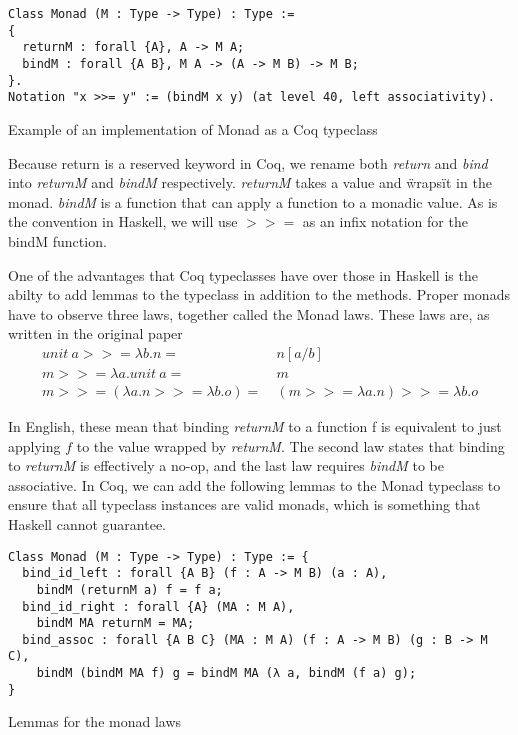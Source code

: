 \begin{listing}[H]
\begin{verbatim}
Class Monad (M : Type -> Type) : Type :=
{
  returnM : forall {A}, A -> M A;
  bindM : forall {A B}, M A -> (A -> M B) -> M B;
}.
Notation "x >>= y" := (bindM x y) (at level 40, left associativity).
\end{verbatim}
\caption{Example of an implementation of Monad as a Coq typeclass}
\label{lst:sample_monad}
\end{listing}

Because return is a reserved keyword in Coq, we rename both \textit{return} and 
\textit{bind} into \textit{returnM} and \textit{bindM} respectively.
\textit{returnM} takes a value and \"wraps\" it in the monad. \textit{bindM} is
a function that can apply a function to a monadic value. As is the convention
in Haskell, we will use $>>=$ as an infix notation for the bindM
function.

One of the advantages that Coq typeclasses have over those in Haskell is the
abilty to add lemmas to the typeclass in addition to the methods. Proper monads
have to observe three laws, together called the Monad laws. These laws are, as
written in the original paper
\begin{align*}
    \textit{unit}\ a >>= \lambda b. n =&\ n[a/b] \\
    m >>= \lambda a . \textit{unit}\ a =&\ m \\
    m >>= (\lambda a.n >>= \lambda b.o) =&\ (m >>= \lambda a.n) >>= \lambda b.o
\end{align*}

In English, these mean that binding \textit{returnM} to a function f is
equivalent to just applying $f$ to the value wrapped by \textit{returnM}. The
second law states that binding to \textit{returnM} is effectively a no-op, and
the last law requires \textit{bindM} to be associative. In Coq, we can add the
following lemmas to the Monad typeclass to ensure that all typeclass instances
are valid monads, which is something that Haskell cannot guarantee. 

\begin{listing}[H]
\begin{verbatim}
Class Monad (M : Type -> Type) : Type := {
  bind_id_left : forall {A B} (f : A -> M B) (a : A), 
    bindM (returnM a) f = f a;
  bind_id_right : forall {A} (MA : M A),
    bindM MA returnM = MA;
  bind_assoc : forall {A B C} (MA : M A) (f : A -> M B) (g : B -> M C),
    bindM (bindM MA f) g = bindM MA (λ a, bindM (f a) g);
}
\end{verbatim}
\caption{Lemmas for the monad laws}
\label{lst:monad_lemmas}
\end{listing}

